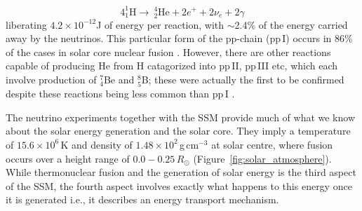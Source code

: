 \begin{equation}
4 ^{1}_1\mathrm{H}  \rightarrow ~^{4}_2\mathrm{He} + 2e^{+} + 2\nu_e + 2\gamma
\end{equation}
liberating $4.2\times10^{-12}$J of energy per reaction, with $\sim$2.4\% of the energy carried away by the neutrinos. This particular form of the pp-chain (pp\,I) occurs in 86\% of the cases in solar core nuclear fusion \citep{turk2011}. However, there are other reactions capable of producing He from H catagorized into pp\,II, pp\,III etc, which each involve production of $^7_4$Be and $^8_5$B; these were actually the first to be confirmed despite these reactions being less common than pp\,I \citep{davis1968}. 

The neutrino experiments together with the SSM provide much of what we know about the solar energy generation and the solar core. They imply a temperature of $15.6\times10^6$\,K and density of $1.48\times10^2$\,g\,cm$^{-3}$ at solar centre, where fusion occurs over a height range of $0.0-0.25\,R_{\odot}$ (Figure~\ref{fig:solar_atmosphere}). While thermonuclear fusion and the generation of solar energy is the third aspect of the SSM, the fourth aspect involves exactly what happens to this energy once it is generated i.e., it describes an energy transport mechanism.


